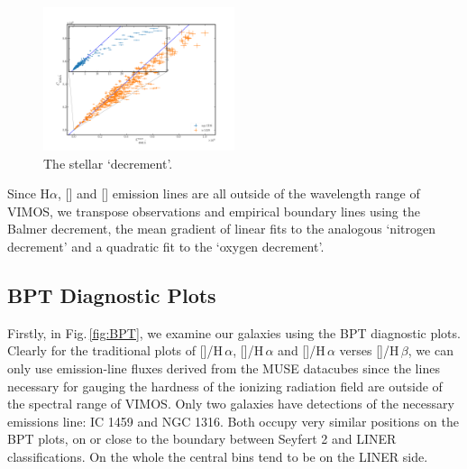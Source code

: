 		\begin{figure}
			\centering
			\includegraphics[width=0.5\textwidth]{chapter5/stellar_ratio.png}
			\caption[]{The stellar `decrement'.} 
			\label{fig:stellarDec}
		\end{figure}


		Since H$\alpha$, [] and [] emission lines are all outside of the wavelength range of VIMOS, we transpose observations and empirical boundary lines using the Balmer decrement, the mean gradient of linear fits to the analogous `nitrogen decrement' and a quadratic fit to the `oxygen decrement'.

	\subsection{BPT Diagnostic Plots}
		\label{subsec:BPT}
		Firstly, in Fig.\,\ref{fig:BPT}, we examine our galaxies using the BPT diagnostic plots. Clearly for the traditional plots of []/H\,$\alpha$, []/H\,$\alpha$ and []/H\,$\alpha$ verses []/H\,$\beta$, we can only use emission-line fluxes derived from the MUSE datacubes since the lines necessary for gauging the hardness of the ionizing radiation field are outside of the spectral range of VIMOS. Only two galaxies have detections of the necessary emissions line: IC 1459 and NGC 1316. Both occupy very similar positions on the BPT plots, on or close to the boundary between Seyfert 2 and LINER classifications. On the whole the central bins tend to be on the LINER side.

